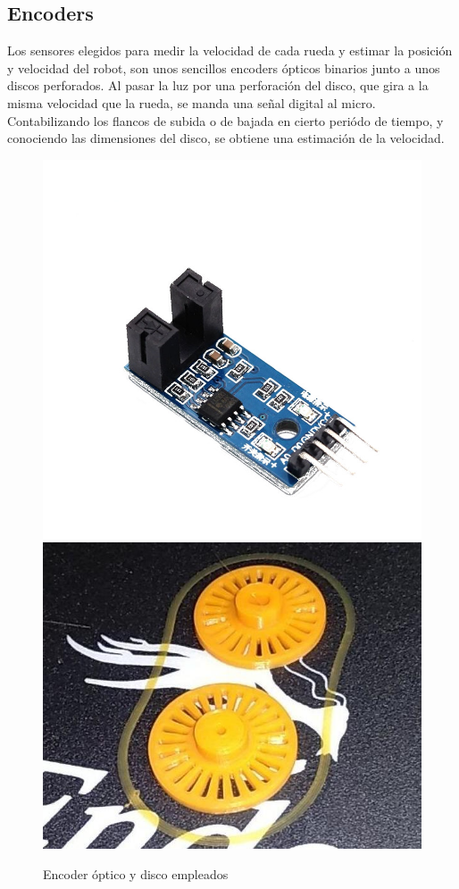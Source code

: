 \subsection{Encoders}\label{enc_hard}
Los sensores elegidos para medir la velocidad de cada rueda y estimar la posición y velocidad del robot, son unos sencillos encoders ópticos binarios junto a unos discos perforados. Al pasar la luz por una perforación del disco, 
que gira a la misma velocidad que la rueda, se manda una señal digital al micro. Contabilizando los flancos de subida o de bajada en cierto periódo de tiempo, y conociendo las dimensiones del disco, se obtiene una estimación de 
la velocidad.
 \begin{figure}[h!]
 	\centering
	 \includegraphics[width=.4\textwidth]{images/hw/encoder_img_rect}
	 \includegraphics[width=.4\textwidth]{images/hw/encoder_stl}
 	\caption{Encoder óptico y disco empleados}
 \end{figure}

